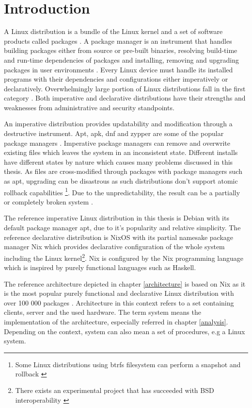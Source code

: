 \chapter{Introduction} \label{johdanto}

A Linux distribution is a bundle of the Linux kernel and a set of
software products called packages \cite{gnuPackagesx2014}.  A package
manager is an instrument that handles building packages either
from source or pre-built binaries, resolving build-time and run-time
dependencies of packages and installing, removing and upgrading
packages in user environments \cite{gnuPackagesx2014}. Every Linux
device must handle its installed programs with their dependencies and
configurations either imperatively or declaratively. Overwhelmingly
large portion of Linux distributions fall in the first category
\cite{dolstra2008nixos}. Both imperative and declarative distributions
have their strengths and weaknesses from administrative and security
standpoints.

An imperative distribution provides updatability and modification through a
destructive instrument. Apt,
apk, dnf and zypper are some of the popular package managers \cite{dolstra2008nixos}. Imperative package
managers can remove and overwrite existing files which leaves the
system in an inconsistent state. Different installs have
different states by nature which causes many problems discussed in this
thesis. As files are cross-modified through packages with package
managers such as apt, upgrading can be disastrous as such distributions
don't support atomic rollback capabilities \footnote{Some Linux
distributions using btrfs filesystem can perform a snapshot and
rollback \cite{opensuseSystemRecovery}}. Due to the unpredictability,
the result can be a partially or completely broken system
\cite{dolstra2008nixos}.

The reference imperative Linux distribution in this thesis is Debian
with its default package manager apt, due to it's popularity and
relative simplicity. The reference declarative distribution is NixOS
with its partial namesake package manager Nix which provides
declarative configuration of the whole system including the Linux
kernel\footnote{There exists an experimental project that has
succeeded with BSD interoperability
\cite{githubGitHubNixosbsdnixbsd}}. Nix is configured by the Nix
programming language which is inspired by purely functional languages
such as Haskell. \cite{van2013reference}

The reference architecture depicted in chapter \ref{architecture} is
based on Nix as it is the most popular purely functional and declarative
Linux distribution with over 100 000 packages
\cite{nixosNixOSSearch}. Architecture in this context refers to a 
set containing clients, server and the used hardware. The term
system means the implementation of the architecture, especially
referred in chapter \ref{analysis}. Depending on the context, system
can also mean a set of procedures, e.g a Linux system. 

